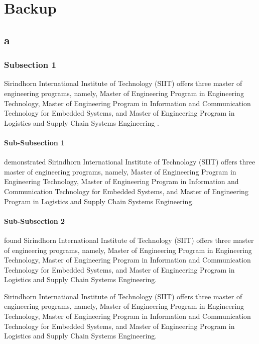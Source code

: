 \chapter{Backup}

\section{a}

\subsection{Subsection 1}

Sirindhorn International Institute of Technology (SIIT) offers three master of
engineering programs, namely, Master of Engineering Program in Engineering
Technology, Master of Engineering Program in Information and Communication
Technology for Embedded Systems, and Master of Engineering Program in Logistics
and Supply Chain Systems Engineering
\citep{Bocchini2013, Smith2005}.

\subsubsection{Sub-Subsection 1}
\cite{Prokop2005} demonstrated
Sirindhorn International Institute of Technology (SIIT) offers three master of
engineering programs, namely, Master of Engineering Program in Engineering
Technology, Master of Engineering Program in Information and Communication 
Technology for Embedded Systems, and Master of Engineering Program in Logistics 
and Supply Chain Systems Engineering.

\subsubsection{Sub-Subsection 2}
\cite{Montanari2003} found Sirindhorn International Institute of Technology
(SIIT) offers three master of engineering programs, namely, Master of Engineering
Program in Engineering Technology, Master of Engineering Program in Information
and Communication Technology for Embedded Systems, and Master of Engineering
Program in Logistics and Supply Chain Systems Engineering.

Sirindhorn International Institute of Technology (SIIT) offers three master of
engineering programs, namely, Master of Engineering Program in Engineering
Technology, Master of Engineering Program in Information and Communication
Technology for Embedded Systems, and Master of Engineering Program in Logistics
and Supply Chain Systems Engineering.

